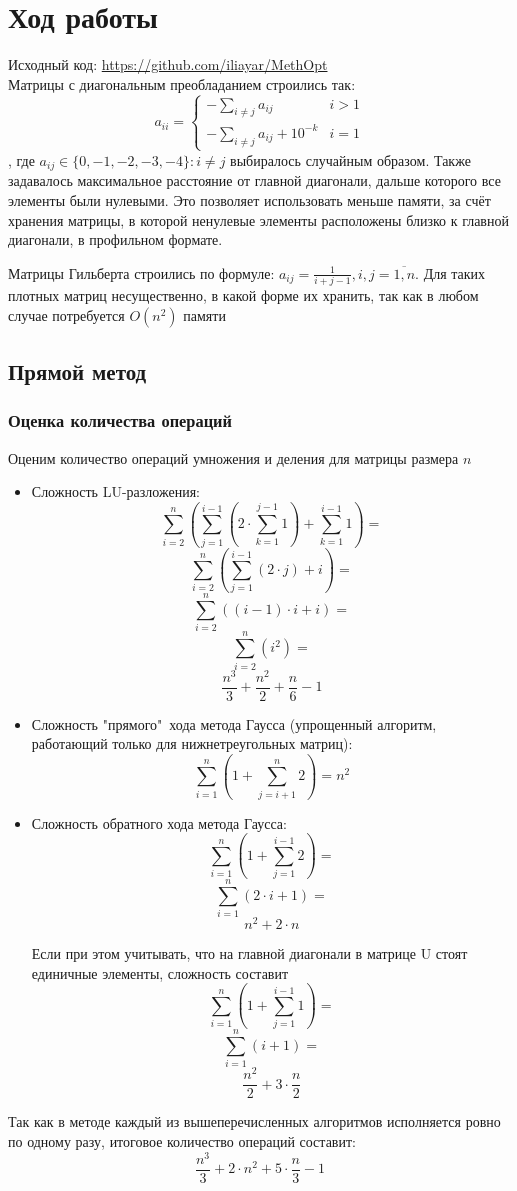 \documentclass[english]{article}
\begin{document}
\section{Ход работы}
Исходный код: \href{https://github.com/iliayar/MethOpt}{https://github.com/iliayar/MethOpt} \\
Матрицы с диагональным преобладанием строились так:
\[ a_{ii} = \begin{cases}
  -\sum\limits_{i \neq j} a_{ij} & i > 1 \\
  -\sum\limits_{i \neq j} a_{ij} + 10^{-k} & i = 1
\end{cases} \]
, где \(a_{ij} \in \{0, -1, -2, -3, -4\}: i \neq j \) выбиралось
случайным образом. Также задавалось максимальное расстояние от главной
диагонали, дальше которого все элементы были нулевыми. Это позволяет
использовать меньше памяти, за счёт хранения матрицы, в которой ненулевые
элементы расположены близко к главной диагонали, в профильном
формате.

Матрицы Гильберта строились по формуле: \(a_{ij} = \frac{1}{i + j -
  1}, i,j = \overline{1, n}\). Для таких плотных матриц несущественно,
в какой форме их хранить, так как в любом случае потребуется
\(O(n^2)\) памяти

\subsection{Прямой метод}
\subsubsection{Оценка количества операций}
Оценим количество операций умножения и деления для матрицы размера \(n\)
\begin{itemize}
\item Сложность LU-разложения:
\[ \sum_{i=2}^{n} (\sum_{j=1}^{i - 1} (2 \cdot \sum_{k=1}^{j-1} 1) + \sum_{k=1}^{i-1} 1) =\]
\[ \sum_{i=2}^{n} (\sum_{j=1}^{i - 1} (2 \cdot j) + i) =\]
\[ \sum_{i=2}^{n} ((i - 1) \cdot i + i) =\]
\[ \sum_{i=2}^{n} (i^2) =\]
\[ \frac{n^3}{3} + \frac{n^2}{2} + \frac{n}{6} - 1\]
\item Сложность "прямого"\ хода метода Гаусса (упрощенный алгоритм, работающий только для нижнетреугольных матриц):
\[ \sum_{i=1}^{n} (1 + \sum_{j=i+1}^{n} 2) = n^2\]
\item Сложность обратного хода метода Гаусса:
\[ \sum_{i=1}^{n} (1 + \sum_{j=1}^{i-1} 2) =\]
\[ \sum_{i=1}^{n} (2 \cdot i + 1) =\]
\[ n^2 + 2 \cdot n\]

Если при этом учитывать, что на главной диагонали в матрице U стоят единичные элементы, сложность составит
\[ \sum_{i=1}^{n} (1 + \sum_{j=1}^{i-1} 1) =\]
\[ \sum_{i=1}^{n} (i + 1) =\]
\[ \frac{n^2}{2} + 3 \cdot \frac{n}{2}\]
\end{itemize}
Так как в методе каждый из вышеперечисленных алгоритмов исполняется ровно по одному разу, итоговое количество операций составит:
\[ \frac{n^3}{3} + 2 \cdot n^2 + 5 \cdot \frac{n}{3} - 1\]
\end{document}
